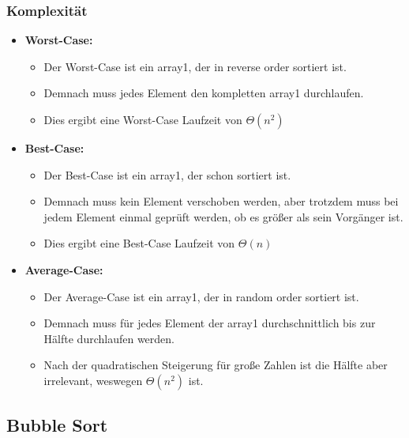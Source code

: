 \documentclass[
../../AuD-Zusammenfassung.tex,
]
{subfiles}
\begin{document}
\subsubsection{Komplexität}
\begin{itemize}
    \item \textbf{Worst-Case:}
    \begin{itemize}
        \item Der Worst-Case ist ein array1, der in reverse order sortiert ist. 
        \item Demnach muss jedes Element den kompletten array1 durchlaufen.
        \item Dies ergibt eine Worst-Case Laufzeit von $\Theta(n^2)$
    \end{itemize}
    \item \textbf{Best-Case:}
    \begin{itemize}
        \item Der Best-Case ist ein array1, der schon sortiert ist.
        \item Demnach muss kein Element verschoben werden, aber trotzdem muss bei jedem Element einmal geprüft werden, ob es größer als sein Vorgänger ist.
        \item Dies ergibt eine Best-Case Laufzeit von $\Theta(n)$
    \end{itemize}
    \item \textbf{Average-Case:}
    \begin{itemize}
        \item Der Average-Case ist ein array1, der in random order sortiert ist.
        \item Demnach muss für jedes Element der array1 durchschnittlich bis zur Hälfte durchlaufen werden.
        \item Nach der quadratischen Steigerung für große Zahlen ist die Hälfte aber irrelevant, weswegen $\Theta(n^2)$ ist.
    \end{itemize}
\end{itemize}
\newpage

\subsection{Bubble Sort}

\end{document}
